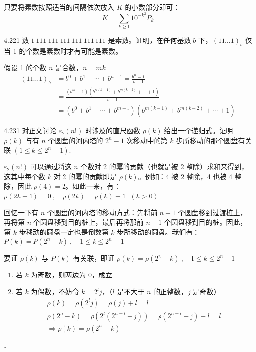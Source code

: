 只要将素数按照适当的间隔依次放入 \( K \) 的小数部分即可：
\[
  K = \sum_{k \ge 1} 10^{-k^2} P_k
\]

\begin{problem}{4.22}{1}
  数 \( 1 \ 111 \ 111 \ 111 \ 111 \ 111 \ 111 \) 是素数。证明，在任何基数 \( b \) 下，\( (1 1 \dots 1)_b \) 仅当 1 的个数是素数时才有可能是素数。
\end{problem}

假设 1 的个数 \( n \) 是合数，\( n = mk \)
\begin{align*}
  (1 1 \dots 1)_b &= b^0 + b^1 + \cdots + b^{n-1} = \frac{b^n-1}{b-1} \\
  &= \frac{(b^m-1) (b^{m(k-1)} + b^{m(k-2)} + \cdots + 1)}{b-1} \\
  &= (b^0 + b^1 + \cdots + b^{m-1}) (b^{m(k-1)} + b^{m(k-2)} + \cdots + 1)
\end{align*}

\begin{problem}{4.23}{1}
  对正文讨论 \( \varepsilon_2 (n!) \) 时涉及的直尺函数 \( \rho (k) \) 给出一个递归式。证明 \( \rho (k) \) 与有 \( n \) 个圆盘的河内塔的 \( 2^n - 1 \) 次移动中的第 \( k \) 步所移动的那个圆盘有关联 \( (1 \le k \le 2^n - 1) \).
\end{problem}

\( \varepsilon_2 (n!) \) 可以通过将这 \( n \) 个数对 2 的幂的贡献（也就是被 2 整除）求和来得到，这其中每个数 \( k \) 对 2 的幂的贡献即是 \( \rho (k) \)。例如：4 被 2 整除，4 也被 4 整除，因此 \( \rho (4) = 2 \)。如此一来，有：\( \rho(2k+1) = 0 \ , \quad \rho(2k) = \rho(k) + 1 \ , (k>0) \)

回忆一下有 \( n \) 个圆盘的河内塔的移动方式：先将前 \( n-1 \) 个圆盘移到过渡桩上，再将第 \( n \) 个圆盘移到目的桩上，最后再将那前 \( n-1 \) 个圆盘移到目的桩。因此，第 \( k \) 步移动的圆盘一定也是倒数第 \( k \) 步所移动的圆盘。我们有：\( P(k) = P(2^n - k) \ , \quad 1 \le k \le 2^n-1 \)

要证 \( \rho (k) \) 与 \( P(k) \) 有关联，即证 \( \rho (k) = \rho (2^n - k) \ , \quad 1 \le k \le 2^n-1 \)
\begin{enumerate}
  \item[1.] 若 \( k \) 为奇数，则两边为 0，成立
  \item[2.] 若 \( k \) 为偶数，不妨令 \( k = 2^l j \)，（\( l \) 是不大于 \( n \) 的正整数，\( j \) 是奇数）
    \begin{gather*}
      \rho(k) = \rho(2^l j) = \rho(j) + l = l \\
      \rho(2^n - k) = \rho(2^l (2^{n-l} - j)) = \rho(2^{n-l} - j) + l = l \\
      \Rightarrow \rho (k) = \rho (2^n - k)
    \end{gather*}
\end{enumerate}
\hfill \( \square \)

